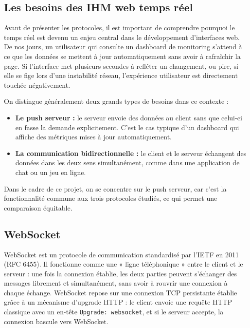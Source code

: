 \subsection{Les besoins des IHM web temps réel}

Avant de présenter les protocoles, il est important de comprendre pourquoi le temps réel est devenu un enjeu central dans le développement d'interfaces web. De nos jours, un utilisateur qui consulte un dashboard de monitoring s'attend à ce que les données se mettent à jour automatiquement sans avoir à rafraîchir la page. Si l'interface met plusieurs secondes à refléter un changement, ou pire, si elle se fige lors d'une instabilité réseau, l'expérience utilisateur est directement touchée négativement.

On distingue généralement deux grands types de besoins dans ce contexte :

\begin{itemize}
    \item \textbf{Le push serveur :} le serveur envoie des données au client sans que celui-ci en fasse la demande explicitement. C'est le cas typique d'un dashboard qui affiche des métriques mises à jour automatiquement.
    \item \textbf{La communication bidirectionnelle :} le client et le serveur échangent des données dans les deux sens simultanément, comme dans une application de chat ou un jeu en ligne.
\end{itemize}

Dans le cadre de ce projet, on se concentre sur le push serveur, car c'est la fonctionnalité commune aux trois protocoles étudiés, ce qui permet une comparaison équitable.

\subsection{WebSocket}

WebSocket est un protocole de communication standardisé par l'IETF en 2011 (RFC 6455). Il fonctionne comme une « ligne téléphonique » entre le client et le serveur : une fois la connexion établie, les deux parties peuvent s'échanger des messages librement et simultanément, sans avoir à rouvrir une connexion à chaque échange. WebSocket repose sur une connexion TCP persistante établie grâce à un mécanisme d'upgrade HTTP : le client envoie une requête HTTP classique avec un en-tête \texttt{Upgrade: websocket}, et si le serveur accepte, la connexion bascule vers WebSocket.

